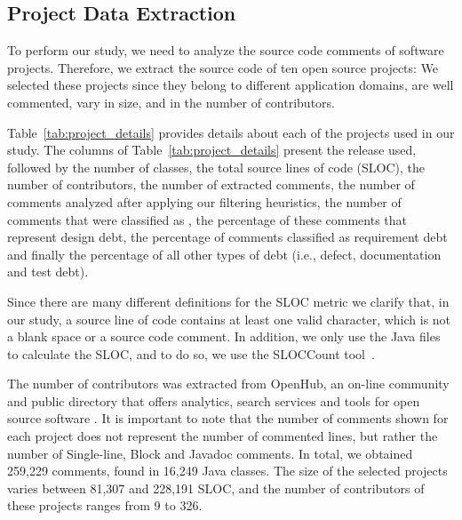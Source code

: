 \subsection{Project Data Extraction} %
\label{sub:data_extraction}

To perform our study, we need to analyze the source code comments of software projects. Therefore, we extract the source code of ten open source projects: We selected these projects since they belong to different application domains, are well commented, vary in size, and in the number of contributors. 
    
Table~\ref{tab:project_details} provides details about each of the projects used in our study. The columns of Table~\ref{tab:project_details} present the release used, followed by the number of classes, the total source lines of code (SLOC), the number of contributors, the number of extracted comments, the number of comments analyzed after applying our filtering heuristics, the number of comments that were classified as \SATD, the percentage of these comments that represent design debt, the percentage of \SATD comments classified as requirement debt and finally the percentage of all other types of debt (i.e., defect, documentation and test debt). 

Since there are many different definitions for the SLOC metric we clarify that, in our study, a source line of code contains at least one valid character, which is not a blank space or a source code comment. In addition, we only use the Java files to calculate the SLOC, and to do so, we use the SLOCCount tool~\cite{wheeler2004:home}. 

The number of contributors was extracted from OpenHub, an on-line community and public directory that offers analytics, search services and tools for open source software \cite{Openhub:home}. It is important to note that the number of comments shown for each project does not represent the number of commented lines, but rather the number of Single-line, Block and Javadoc comments. In total, we obtained 259,229 comments, found in 16,249 Java classes. The size of the selected projects varies between 81,307 and 228,191 SLOC, and the number of contributors of these projects ranges from 9 to 326. 


